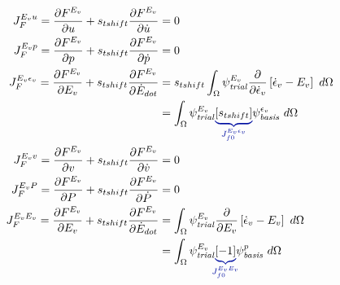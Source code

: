 \begin{align}
    J_F^{E_{v} u} = \frac{\partial F^{E_{v}}}{\partial u} + s_{tshift} \frac{\partial F^{ E_{v}}}{\partial \dot{u}}                      & = 0                                                                                                                                          \\
    J_F^{E_{v} p} = \frac{\partial F^{E_{v}}}{\partial p} + s_{tshift} \frac{\partial F^{ E_{v}}}{\partial \dot{p}}                      & = 0                                                                                                                                          \\
    J_F^{E_{v} \epsilon_{v}} = \frac{\partial F^{E_{v}}}{\partial E_{v}} + s_{tshift} \frac{\partial F^{ E_{v}}}{\partial \dot{E}_{dot}} & =
    s_{tshift} \int_{\Omega} \trialscalar[E_{v}] \frac{\partial}{\partial \dot{\epsilon}_{v}} \left[ \dot{\epsilon}_{v} - E_{v} \right] \ d\Omega                                                                                                                                       \\
                                                                                                                                         & = \int_{\Omega} \trialscalar[E_{v}] \eqnannotate{\left[s_{tshift} \right]}{J_{f0}^{E_{v} \epsilon_{v}}} \basisscalar[\epsilon_{v}] \ d\Omega \\
    J_F^{E_{v} v} = \frac{\partial F^{E_{v}}}{\partial v} + s_{tshift} \frac{\partial F^{ E_{v} }}{\partial \dot{v}}                     & = 0                                                                                                                                          \\
    J_F^{E_{v} P} = \frac{\partial F^{E_{v}}}{\partial P} + s_{tshift} \frac{\partial F^{ E_{v} }}{\partial \dot{P}}                     & = 0                                                                                                                                          \\
    J_F^{E_{v} E_{v}} = \frac{\partial F^{E_{v}}}{\partial E_{v}} + s_{tshift} \frac{\partial F^{ E_{v} }}{\partial \dot{E}_{dot}}       & =
    \int_{\Omega} \trialscalar[E_{v}] \frac{\partial}{\partial E_{v}} \left[ \dot{\epsilon}_{v} - E_{v} \right] \ d\Omega                                                                                                                                                               \\
                                                                                                                                         & = \int_{\Omega} \trialscalar[E_{v}] \eqnannotate{\left[ -1 \right]}{J_{f0}^{E_{v} E_{v}}} \basisscalar[p] \ d\Omega                          \\
\end{align}


